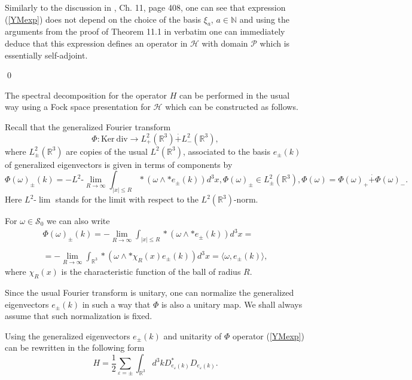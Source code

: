 \documentclass{amsart}
\begin{document}
\pr
Similarly to the discussion in \cite{Hid}, Ch. 11, page 408, one can see that expression (\ref{YMexp}) does not depend on the choice of the basis $\xi_a$, $a\in \mathbb{N}$ and using the arguments from the proof of Theorem 11.1 in \cite{Hid} verbatim one can immediately deduce that this expression defines an operator in $\mathcal{H}$ with domain $\mathcal{P}$ which is essentially self-adjoint. 

\qed

The spectral decomposition for the operator $H$ can be performed in the usual way using a Fock space presentation for $\mathcal{H}$ which can be constructed as follows. 

Recall that the generalized Fourier transform
$$
\Phi:\mathrm{Ker}~\mathrm{div}\rightarrow
L^2_{+}(\mathbb{R}^{3})\stackrel{\cdot}{+}
L^2_{-}(\mathbb{R}^{3}),
$$
where $L^2_{\pm}(\mathbb{R}^{3})$
are copies of the usual $L^2(\mathbb{R}^{3})$, associated to
the basis $e_{\pm}(k)$ of generalized eigenvectors is given in terms of components by
\begin{equation}\label{fouriero}
\Phi(\omega)_{\pm}(k)=-L^{2}\text{-}\lim_{R\rightarrow \infty}\int_{|x|\leq R}
*(\omega\wedge *{e_{\pm}(k)})d^3x, \Phi(\omega)_{\pm}\in L^2_{\pm}(\mathbb{R}^{3}), \Phi(\omega)=\Phi(\omega)_+\stackrel{\cdot}{+}\Phi(\omega)_-.
\end{equation}
Here $L^{2}\text{-}\lim$ stands for the limit with respect to the
$L^2(\mathbb{R}^{3})$-norm.

For $\omega \in \mathcal{S}_0$ we can also
write
\begin{equation}\label{fouriero1}
\begin{array}{l}
\Phi(\omega)_{\pm}(k)=-\lim_{R\rightarrow \infty}\int_{|x|\leq R}
*(\omega\wedge *{e_{\pm}(k)})d^3x= \\
\\
=-\lim_{R\rightarrow \infty}\int_{\mathbb{R}^3}
*(\omega\wedge *{\chi_R(x)e_{\pm}(k)})d^3x=\langle \omega,e_{\pm}(k)\rangle ,
\end{array}
\end{equation}
where $\chi_R(x)$ is the characteristic function of the ball of radius $R$.

Since the usual Fourier transform is unitary, one can normalize the generalized eigenvectors $e_{\pm}(k)$ in such a way that $\Phi$ is also a unitary map. We shall always assume that such normalization is fixed.

Using the generalized eigenvectors $e_{\pm}(k)$ and unitarity of $\Phi$ operator (\ref{YMexp}) can be rewritten in the following form
\begin{equation}\label{YMsym}
H=\frac12\sum_{\varepsilon=\pm}\int_{\mathbb{R}^3}d^3k D^*_{e_{\varepsilon}(k)}D_{e_{\varepsilon}(k)}.
\end{equation}
 
\end{document}
